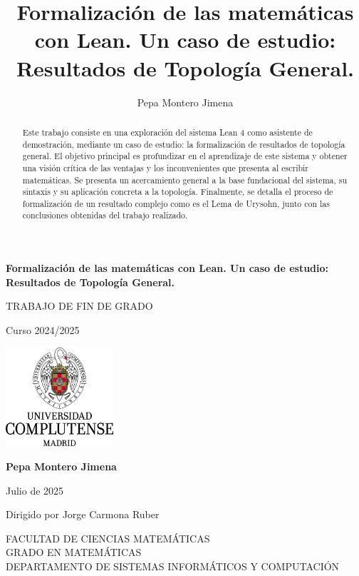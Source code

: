 \documentclass{article}
\title{Formalización de las matemáticas con Lean. Un caso de estudio: Resultados de Topología General.}
\author{Pepa Montero Jimena}
\date{}
\begin{document}


\vspace{2cm}

\begin{center}
    {\LARGE \textbf{Formalización de las matemáticas con Lean. Un caso de estudio: Resultados de Topología General.}\par}
    \vspace{0.5cm}
    
    {\Large TRABAJO DE FIN DE GRADO\par}
    
    {\large Curso 2024/2025\par}
    
    \vspace{2cm}
    
    \includegraphics[width=0.3\textwidth]{figuras/logo.png}
    
    \vspace{2cm}
    
    {\large \textbf{Pepa Montero Jimena}\par}
    \vspace{0.2cm}
    {\large Julio de 2025\par}
    \vspace{0.2cm}
    {\large Dirigido por Jorge Carmona Ruber\par}
\end{center}

\vfill

{\small
FACULTAD DE CIENCIAS MATEMÁTICAS\\
GRADO EN MATEMÁTICAS\\
DEPARTAMENTO DE SISTEMAS INFORMÁTICOS Y COMPUTACIÓN
}


\newpage

\begin{abstract}
Este trabajo consiste en una exploración del sistema Lean 4 como asistente de demostración, mediante un caso de estudio: la formalización de resultados de topología general. El objetivo principal es profundizar en el aprendizaje de este sistema y obtener una visión crítica de las ventajas y los inconvenientes que presenta al escribir matemáticas. Se presenta un acercamiento general a la base fundacional del sistema, su sintaxis y su aplicación concreta a la topología. Finalmente, se detalla el proceso de formalización de un resultado complejo como es el Lema de Urysohn, junto con las conclusiones obtenidas del trabajo realizado.
\end{abstract}
\end{document}
